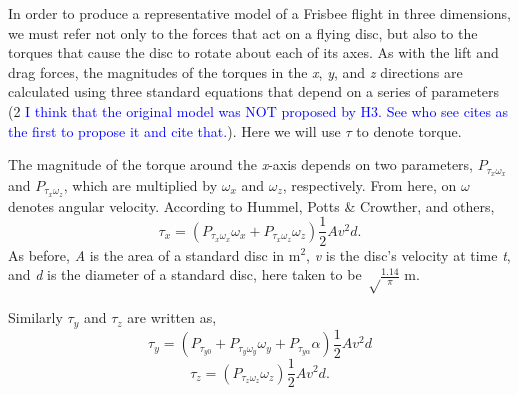 \documentclass[a4paper,12pt, oneside]{article}
\newcommand{\red}[1]{\textcolor{red}{#1}}
\newcommand{\blue}[1]{\textcolor{blue}{#1}}
\begin{document}
In order to produce a representative model of a Frisbee flight in three dimensions, we must refer not only to the forces that act on a flying disc, but also to the torques that cause the disc to rotate about each of its axes. As with the lift and drag forces, the magnitudes of the torques in the \textit{x}, \textit{y}, and \textit{z} directions are calculated using three standard equations that depend on a series of parameters (2 \blue{I think that the original model was NOT proposed by H3. See who see cites as the first to propose it and cite that.}). Here we will use $\tau$ to denote torque.

The magnitude of the torque around the \textit{x}-axis depends on two parameters, $P_{\tau_x\omega_x}$ and $P_{\tau_x\omega_z}$, which are multiplied by $\omega_x$ and $\omega_z$, respectively. From here, on $\omega$ denotes angular velocity. According to Hummel, Potts \& Crowther, and others,
\begin{equation}
  \tau_x=(P_{\tau_x\omega_x}\omega_x+P_{\tau_x\omega_z}\omega_z)\frac{1}2Av^2d.
\end{equation}
As before, \textit{A} is the area of a standard disc in m$^2$, \textit{v} is the disc's velocity at time \textit{t}, and \textit{d} is the diameter of a standard disc, here taken to be $\sqrt\frac{1.14}\pi$ m.

Similarly $\tau_y$ and $\tau_z$ are written as,
\begin{equation}
  \tau_y=(P_{\tau_{y0}}+P_{\tau_y\omega_y}\omega_y+P_{\tau_{y\alpha}}\alpha)\frac{1}2Av^2d
\end{equation}
\begin{equation}
  \tau_z=(P_{\tau_z\omega_z}\omega_z)\frac{1}2Av^2d.
\end{equation}
\end{document}
